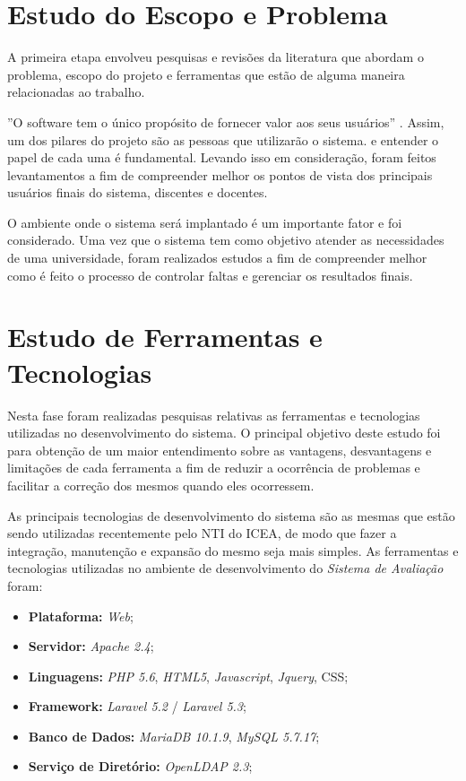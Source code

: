 \documentclass[
  12pt,       %
  openright,      %
  oneside,      %
  a4paper,      %
  english,      %
  french,        %
  spanish,     %
  brazil        %
  ]{abntex2-decsi}
\begin{document}
    \section{Estudo do Escopo e Problema}

    A primeira etapa envolveu pesquisas e revisões da literatura que abordam o problema, escopo do projeto e ferramentas que estão de alguma maneira relacionadas ao trabalho. 

    ''O software tem o único propósito de fornecer valor aos seus usuários'' \cite[tradução nossa]{hooker:1996}. Assim, um dos pilares do projeto são as pessoas que utilizarão o sistema.  e entender o papel de cada uma é fundamental. Levando isso em consideração, foram feitos levantamentos a fim de compreender melhor os pontos de vista dos principais usuários finais do sistema, discentes e docentes.

    O ambiente onde o sistema será implantado é um importante fator e foi considerado. Uma vez que o sistema tem como objetivo atender as necessidades de uma universidade, foram realizados estudos a fim de compreender melhor como é feito o processo de controlar faltas e gerenciar os resultados finais.
    
    \section{Estudo de Ferramentas e Tecnologias}

    Nesta fase foram realizadas pesquisas relativas as ferramentas e tecnologias utilizadas no desenvolvimento do sistema. O principal objetivo deste estudo foi para obtenção de um maior entendimento sobre as vantagens, desvantagens e limitações de cada ferramenta a fim de reduzir a ocorrência de problemas e facilitar a correção dos mesmos quando eles ocorressem.

    As principais tecnologias de desenvolvimento do sistema são as mesmas que estão sendo utilizadas recentemente pelo NTI do ICEA, de modo que fazer a integração, manutenção e expansão do mesmo seja mais simples. As ferramentas e tecnologias utilizadas no ambiente de desenvolvimento do \textit{Sistema de Avaliação} foram:

    \begin{itemize}
        \item \textbf{Plataforma:} \textit{Web};
        \item \textbf{Servidor:} \textit{Apache 2.4};
        \item \textbf{Linguagens:} \textit{PHP 5.6}, \textit{HTML5}, \textit{Javascript}, \textit{Jquery}, CSS;
        \item \textbf{Framework:} \textit{Laravel 5.2} / \textit{Laravel 5.3};
        \item \textbf{Banco de Dados:} \textit{MariaDB 10.1.9},\textit{ MySQL 5.7.17};
        \item \textbf{Serviço de Diretório:} \textit{OpenLDAP 2.3};
    \end{itemize}
\end{document}
